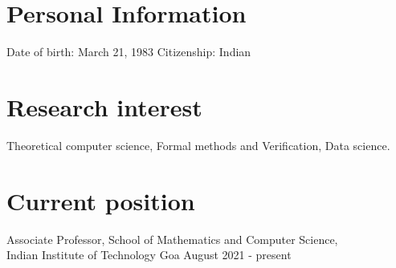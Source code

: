 \documentclass[margin]{res}
\begin{document}
\begin{resume}
 
\ifpersonal
\section{Personal Information}
Date of birth: March 21, 1983 \hfill Citizenship: Indian
\fi

\section{Research interest}
Theoretical computer science, Formal methods and Verification, Data science.

\section{Current position}
					Associate Professor, School of Mathematics and Computer Science, \\
					Indian Institute of Technology Goa  \hfill  August 2021 - present


\end{resume}
\end{document}
